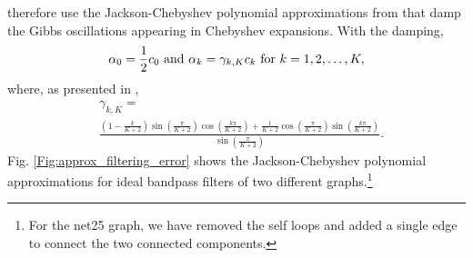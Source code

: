 \documentclass[journal, 10pt]{IEEEtran}
\begin{document}
therefore use the Jackson-Chebyshev polynomial approximations from \cite{di2016efficient,puy_structured_sampling} that damp the Gibbs oscillations appearing in Chebyshev expansions. With the damping, 
\begin{align}\label{Eq:damping1}
\alpha_0=\frac{1}{2}c_0 \hbox{ and }\alpha_k=\gamma_{k,K}c_k \hbox{ for }k=1,2,\ldots,K, 
\end{align}
where, as presented in \cite{di2016efficient}, 
\begin{align}
&\gamma_{k,K} =\label{Eq:damping2}\\
& \frac{(1-\frac{k}{K+2})\sin(\frac{\pi}{K+2})\cos(\frac{k\pi}{K+2})+\frac{1}{K+2}\cos(\frac{\pi}{K+2})\sin(\frac{k\pi}{K+2})}{\sin(\frac{\pi}{K+2})}.  \nonumber
\end{align}
Fig. \ref{Fig:approx_filtering_error} shows the Jackson-Chebyshev polynomial approximations for ideal bandpass filters of two different graphs.\footnote{For the net25 graph, we have removed the self loops and added a single edge to connect the two connected components.}
\end{document}
